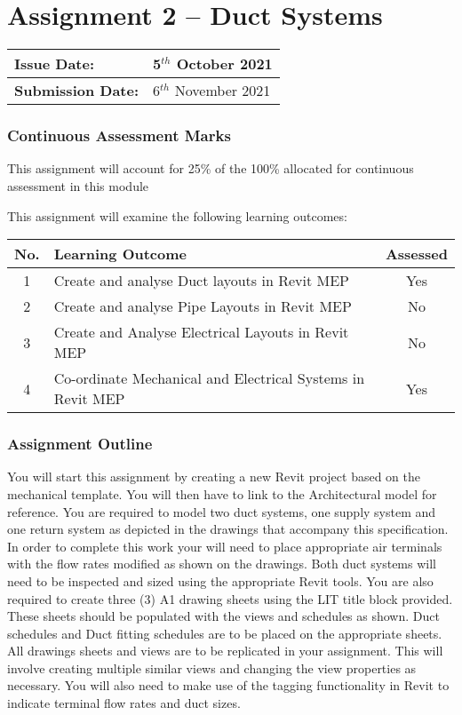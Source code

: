 
	
\part*{Assignment 2 – Duct Systems}

\begin{tabularx}{\textwidth}{ |X|X| }
	\hline
	\textbf{Issue Date:} & 5$^{th}$ October 2021 \\
	\hline 
	\textbf{Submission Date:}  & 6$^{th}$ November 2021  \\
	\hline
\end{tabularx}


\section*{Continuous Assessment Marks}
This assignment will account for 25\% of the 100\% allocated for continuous assessment in this module

This assignment will examine the following learning outcomes:\\

\begin{tabularx}{\textwidth}{ |c|X|c| }
	\hline
	\textbf{No.} & \textbf{Learning Outcome} & \textbf{Assessed} \\
	\hline 
	1  & Create and analyse Duct layouts in Revit MEP & Yes \\
	2  & Create and analyse Pipe Layouts in Revit MEP & No \\
	3  & Create and Analyse Electrical Layouts in Revit MEP & No \\
	4  & Co-ordinate Mechanical and Electrical Systems in Revit MEP & Yes \\
	\hline
\end{tabularx}



\section*{Assignment Outline}
You will start this assignment by creating a new Revit project based on the mechanical template.  You will then have to link to the Architectural model for reference.  You are required to model two duct systems, one supply system and one return system as depicted in the drawings that accompany this specification. In order to complete this work your will need to place appropriate air terminals with the flow rates modified as shown on the drawings. Both duct systems will need to be inspected and sized using the appropriate Revit tools. You are also required to create three (3) A1 drawing sheets using the LIT title block provided. These sheets should be populated with the views and schedules as shown.  Duct schedules and Duct fitting schedules are to be placed on the appropriate sheets. All drawings sheets and views are to be replicated in your assignment. This will involve creating multiple similar views and changing the view properties as necessary. You will also need to make use of the tagging functionality in Revit to indicate terminal flow rates and duct sizes.\\


